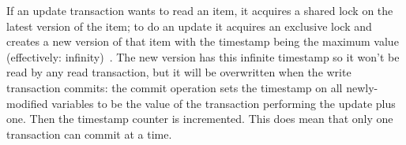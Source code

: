If an update transaction wants to read an item, it acquires a shared lock on the latest version of the item; to do an update it acquires an exclusive lock and creates a new version of that item with the timestamp being the maximum value (effectively: infinity)~\cite{dsc}. The new version has this infinite timestamp so it won't be read by any read transaction, but it will be overwritten when the write transaction commits:  the commit operation sets the timestamp on all newly-modified variables to be the value of the transaction performing the update plus one. Then the timestamp counter is incremented. This does mean that only one transaction can commit at a time.




